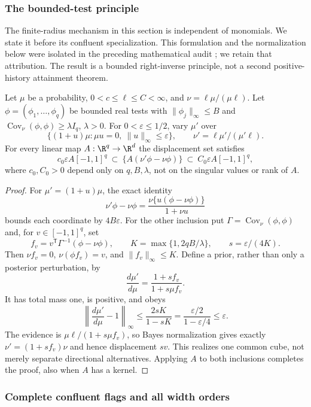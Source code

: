 \subsubsection{The bounded-test principle}
The finite-radius mechanism in this section is independent of monomials.
We state it before its confluent specialization. This formulation and the
normalization below were isolated in the preceding mathematical audit
\cite{A1v14audit}; we retain that attribution. The result is a bounded
right-inverse principle, not a second positive-history attainment theorem.

\begin{proposition}
\label{prop:general-bounded-dual}
Let $\mu$ be a probability, $0<c\le\ell\le C<\infty$, and
$\nu=\ell\mu/(\mu\ell)$. Let $\phi=(\phi_1,\ldots,\phi_q)$ be
bounded real tests with $\|\phi_j\|_\infty\le B$ and
$\operatorname{Cov}_\nu(\phi,\phi)\ge\lambda I_q$, $\lambda>0$.
For $0<\varepsilon\le1/2$, vary $\mu'$ over
\[
 \{(1+u)\mu:\mu u=0,\ \|u\|_\infty\le\varepsilon\},
 \qquad \nu'=\ell\mu'/(\mu'\ell).
\]
For every linear map $A:\R^q\to\R^d$ the displacement set satisfies
\[
 c_0\varepsilon A[-1,1]^q
 \ \subset\ \{A(\nu'\phi-\nu\phi)\}
 \ \subset\ C_0\varepsilon A[-1,1]^q,
\]
where $c_0,C_0>0$ depend only on $q,B,\lambda$, not on the singular
values or rank of $A$.
\end{proposition}
\begin{proof}
For $\mu'=(1+u)\mu$, the exact identity
\[
 \nu'\phi-\nu\phi
 =\frac{\nu\{u(\phi-\nu\phi)\}}{1+\nu u}
\]
bounds each coordinate by $4B\varepsilon$. For the other inclusion put
$\Gamma=\operatorname{Cov}_\nu(\phi,\phi)$ and, for
$v\in[-1,1]^q$, set
\[
 f_v=v^{\mathsf T}\Gamma^{-1}(\phi-\nu\phi),\qquad
 K=\max\{1,2qB/\lambda\},\qquad s=\varepsilon/(4K).
\]
Then $\nu f_v=0$, $\nu(\phi f_v)=v$, and $\|f_v\|_\infty\le K$.
Define a prior, rather than only a posterior perturbation, by
\[
 \frac{d\mu'}{d\mu}=\frac{1+s f_v}{1+s\mu f_v}.
\]
It has total mass one, is positive, and obeys
\[
 \left\|\frac{d\mu'}{d\mu}-1\right\|_\infty
 \le\frac{2sK}{1-sK}
 =\frac{\varepsilon/2}{1-\varepsilon/4}\le\varepsilon.
\]
The evidence is $\mu\ell/(1+s\mu f_v)$, so Bayes normalization gives
exactly $\nu'=(1+s f_v)\nu$ and hence displacement $sv$. This realizes
one common cube, not merely separate directional alternatives. Applying
$A$ to both inclusions completes the proof, also when $A$ has a kernel.
\end{proof}

\subsubsection{Complete confluent flags and all width orders}


